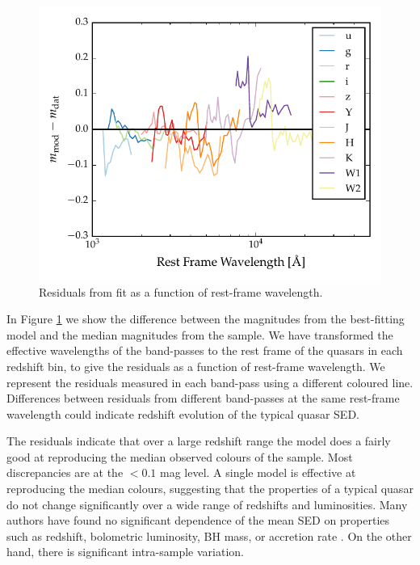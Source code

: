 \begin{figure}
  \centering
  \includegraphics[width=\textwidth]{figures/chapter05/model_residuals.pdf}
  \caption[{Residuals from fit as a function of rest-frame wavelength.}]{Residuals from fit as a function of rest-frame wavelength. }
  \label{fig:residuals}
\end{figure}

In Figure \ref{fig:residuals} we show the difference between the magnitudes from the best-fitting model and the median magnitudes from the sample. 
We have transformed the effective wavelengths of the band-passes to the rest frame of the quasars in each redshift bin, to give the residuals as a function of rest-frame wavelength. 
We represent the residuals measured in each band-pass using a different coloured line. 
Differences between residuals from different band-passes at the same rest-frame wavelength could indicate redshift evolution of the typical quasar SED. 

The residuals indicate that over a large redshift range the model does a fairly good at reproducing the median observed colours of the sample. 
Most discrepancies are at the $<0.1$ mag level. 
A single model is effective at reproducing the median colours, suggesting that the properties of a typical quasar do not change significantly over a wide range of redshifts and luminosities. 
Many authors have found no significant dependence of the mean SED on properties such as redshift, bolometric luminosity, BH mass, or accretion rate \citep[e.g.][]{elvis12,hao13}. 
On the other hand, there is significant intra-sample variation. 

